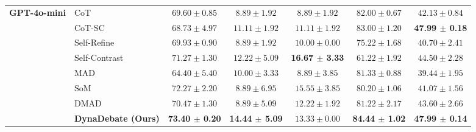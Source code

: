 \begin{table}[t]
{\begin{tabular}{llccccc}
\multirow{8}{*}{\textbf{GPT-4o-mini}}
 & CoT              & $69.60 \pm 0.85$                  & $8.89 \pm 1.92$                   & $8.89 \pm 1.92$                   & $82.00 \pm 0.67$                  & $42.13 \pm 0.84$ \\
 & CoT-SC           & $68.73 \pm 4.97$                  & $11.11 \pm 1.92$                  & $11.11 \pm 1.92$                  & \underline{$83.00 \pm 1.20$}       & \textbf{47.99 $\pm$ 0.18} \\
 & Self-Refine      & $69.93 \pm 0.90$                  & $8.89 \pm 1.92$                   & $10.00 \pm 0.00$                  & $75.22 \pm 1.68$                  & $40.70 \pm 2.41$ \\
 & Self-Contrast    & $71.27 \pm 1.30$                  & \underline{$12.22 \pm 5.09$}       & \textbf{16.67 $\pm$ 3.33}          & $61.22 \pm 1.92$                  & \underline{$44.50 \pm 2.28$} \\
 & MAD              & $64.40 \pm 5.40$                  & $10.00 \pm 3.33$                  & $8.89 \pm 3.85$                   & $81.33 \pm 0.88$                  & $39.44 \pm 1.95$ \\
 & SoM              & \underline{$72.27 \pm 2.20$}       & $8.89 \pm 6.95$                   & \underline{$15.55 \pm 3.85$}       & $80.20 \pm 1.06$                  & $41.07 \pm 1.56$ \\
 & DMAD             & $70.47 \pm 1.30$                  & $8.89 \pm 5.09$                   & $12.22 \pm 1.92$                  & $81.22 \pm 2.17$                  & $43.60 \pm 2.66$ \\
 & \textbf{DynaDebate (Ours)} & \textbf{73.40 $\pm$ 0.20}   & \textbf{14.44 $\pm$ 5.09}          & $13.33 \pm 0.00$                  & \textbf{84.44 $\pm$ 1.02}          & \textbf{47.99 $\pm$ 0.14} \\
\midrule


\end{tabular}}
\end{table}
